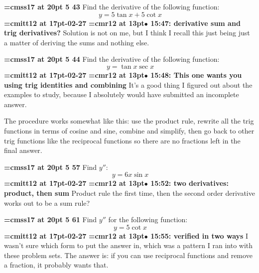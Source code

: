 {\medskip\noindent\bf\font\titlefont=cmss17 at 20pt 5 43}\medskip
Find the derivative of the following function:
$$\
y = 5 \tan x + 5 \cot x
$$
{\medskip\noindent\bf\font\titlefont=cmitt12 at 17pt-02-27}\medskip
{\smallskip\noindent\bf\font\titlefont=cmr12 at 13pt\titlefont $\bullet$ 15:47: derivative sum and trig derivatives?}\smallskip
Solution is not on me, but I think I recall this just being just a matter of deriving the sums and nothing else.
\par

{\medskip\noindent\bf\font\titlefont=cmss17 at 20pt 5 44}\medskip
Find the derivative of the following function:
$$\
y = \tan x \sec x
$$
{\medskip\noindent\bf\font\titlefont=cmitt12 at 17pt-02-27}\medskip
{\smallskip\noindent\bf\font\titlefont=cmr12 at 13pt\titlefont $\bullet$ 15:48: This one wants you using trig identities and combining}\smallskip
It's a good thing I figured out about the examples to study, because I absolutely would have submitted an incomplete answer.
\par

The procedure works somewhat like this: use the product rule, rewrite all the trig functions in terms of cosine and sine, combine and simplify, then go back to other trig functions like the reciprocal functions so there are no fractions left in the final answer.
\par

{\medskip\noindent\bf\font\titlefont=cmss17 at 20pt 5 57}\medskip
Find $y''$:
$$\
y = 6x \sin x
$$
{\medskip\noindent\bf\font\titlefont=cmitt12 at 17pt-02-27}\medskip
{\smallskip\noindent\bf\font\titlefont=cmr12 at 13pt\titlefont $\bullet$ 15:52: two derivatives: product, then sum}\smallskip
Product rule the first time, then the second order derivative works out to be a sum rule?
\par

\xrdef{node82}
{\medskip\noindent\bf\font\titlefont=cmss17 at 20pt 5 61}\medskip
Find $y''$ for the following function:
$$\
y = 5 \cot x
$$
{\medskip\noindent\bf\font\titlefont=cmitt12 at 17pt-02-27}\medskip
{\smallskip\noindent\bf\font\titlefont=cmr12 at 13pt\titlefont $\bullet$ 15:55: verified in two ways}\smallskip
I wasn't sure which form to put the answer in, which was a pattern I ran into with these problem sets. The answer is: if you can use reciprocal functions and remove a fraction, it probably wants that.
\par

